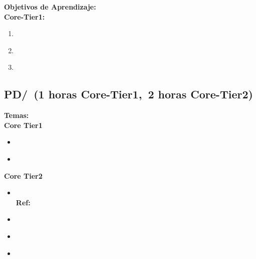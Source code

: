 \noindent \textbf{Objetivos de Aprendizaje:}\\
\noindent \textbf{Core-Tier1:}
\begin{enumerate}
	\setcounter{enumi}{0}
	\item \PDParallelismFundamentalsLODistinguishUsing\xspace[\PDParallelismFundamentalsLODistinguishUsingLevel]\label{sec:BOK:PDParallelismFundamentalsLODistinguishUsing}
	\item \PDParallelismFundamentalsLODistinguishMultiple\xspace[\PDParallelismFundamentalsLODistinguishMultipleLevel]\label{sec:BOK:PDParallelismFundamentalsLODistinguishMultiple}
	\item \PDParallelismFundamentalsLODistinguishData\xspace[\PDParallelismFundamentalsLODistinguishDataLevel]\label{sec:BOK:PDParallelismFundamentalsLODistinguishData}
\end{enumerate}


\subsection{PD/\PDParallelDecomposition~(1 horas Core-Tier1,~2 horas Core-Tier2)}\label{sec:BOK:PDParallelDecomposition}
\noindent \textbf{Temas:}\\
\noindent \textbf{Core Tier1}
\begin{itemize}
	\item \PDParallelDecompositionTopicNeed\label{sec:BOK:PDParallelDecompositionTopicNeed}
	\item \PDParallelDecompositionTopicIndependence\label{sec:BOK:PDParallelDecompositionTopicIndependence}
\end{itemize}

\noindent \textbf{Core Tier2}
\begin{itemize}
	\item \PDParallelDecompositionTopicBasic\xspace \\ \textbf{Ref:} \label{sec:BOK:PDParallelDecompositionTopicBasic}
	\item \PDParallelDecompositionTopicTask\label{sec:BOK:PDParallelDecompositionTopicTask}
	\item \PDParallelDecompositionTopicData\label{sec:BOK:PDParallelDecompositionTopicData}
	\item \PDParallelDecompositionTopicActors\label{sec:BOK:PDParallelDecompositionTopicActors}
\end{itemize}


